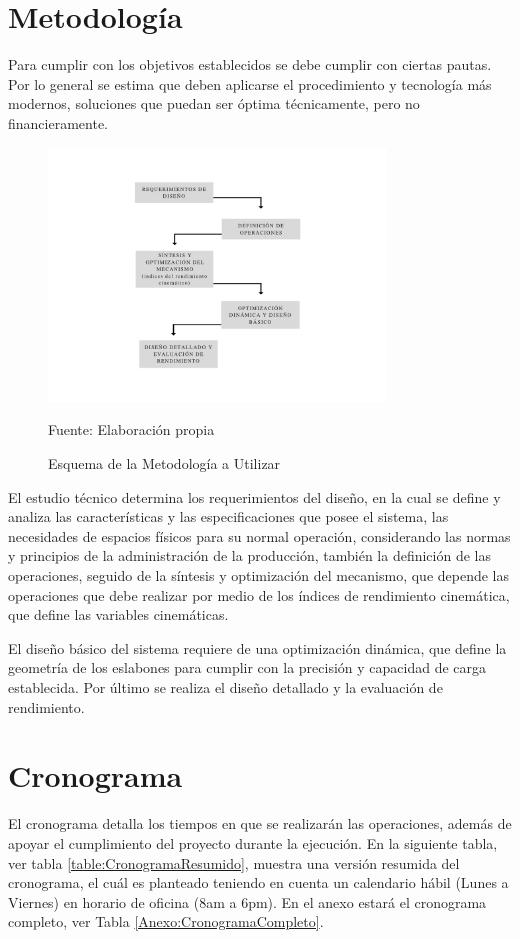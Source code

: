 \section{Metodología}
Para cumplir con los objetivos establecidos se debe cumplir con ciertas pautas. Por lo general se estima que deben aplicarse el procedimiento y tecnología más modernos, soluciones que puedan ser óptima técnicamente, pero no financieramente.

\begin{figure}[htb!]
    \centering
    \includegraphics[width=0.8\textwidth]{Cap1_FormulaciondelProyecto/Figuras/MetodologiaEsquema.pdf}
    \caption{Esquema de la Metodología a Utilizar}{Fuente: Elaboración propia}
    \label{fig:MetodologiaEsquema}
\end{figure}

El estudio técnico determina los requerimientos del diseño, en la cual se define y analiza las características y las especificaciones que posee el sistema, las necesidades de espacios físicos para su normal operación, considerando las normas y principios de la administración de la producción, también la definición de las operaciones, seguido de la síntesis y optimización del mecanismo, que depende las operaciones que debe realizar por medio de los índices de rendimiento cinemática, que define las variables cinemáticas. 

El diseño básico del sistema requiere de una optimización dinámica, que define la geometría de los eslabones para cumplir con la precisión y capacidad de carga establecida. Por último se realiza el diseño detallado y la evaluación de rendimiento.

\section{Cronograma}
El cronograma detalla los tiempos en que se realizarán las operaciones, además de apoyar el cumplimiento del proyecto durante la ejecución. En la siguiente tabla, ver tabla \ref{table:CronogramaResumido}, muestra una versión resumida del cronograma, el cuál es planteado teniendo en cuenta un calendario hábil (Lunes a Viernes) en horario de oficina (8am a 6pm). En el anexo estará el cronograma completo, ver Tabla \ref{Anexo:CronogramaCompleto}.
